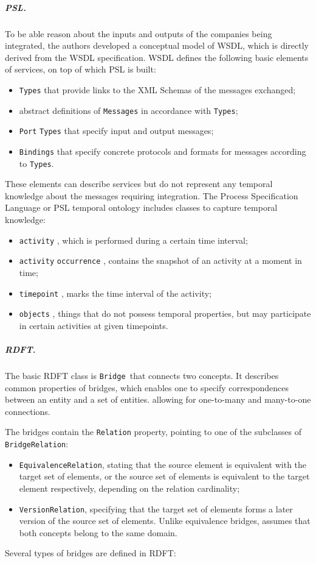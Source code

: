 \subparagraph{PSL.}
To be able reason about the inputs and outputs of the companies being
integrated, the authors developed a conceptual model of WSDL, which is
directly derived from the WSDL specification. WSDL defines the
following basic elements of services, on top of which PSL is built: 

\begin{itemize}
\item \texttt{Types} that provide links to the XML Schemas
of the messages exchanged; 
\item abstract definitions of \texttt{Messages} in
accordance with \texttt{Types}; 
\item \texttt{Port} \texttt{Types} that
specify input and output messages; 
\item \texttt{Bindings} that specify concrete protocols and
formats for messages according to \texttt{Types}. 
\end{itemize}
These elements can describe services but do not represent any temporal
knowledge about the messages requiring integration. The Process
Specification Language or PSL temporal ontology includes classes to
capture temporal knowledge: 

\begin{itemize}
\item \texttt{activity} , which is performed during a
certain time interval; 
\item \texttt{activity} \texttt{occurrence} ,
contains the snapshot of an activity at a moment in time; 
\item \texttt{timepoint} , marks the time interval of the
activity; 
\item \texttt{objects} , things that do not possess
temporal properties, but may participate in certain activities at given
timepoints. 
\end{itemize}
\subparagraph{RDFT.}
The basic RDFT class is \texttt{Bridge }that connects two
concepts. It describes common properties of bridges, which enables one
to specify correspondences between an entity and a set of entities.
allowing for one-to-many and many-to-one connections. 

The bridges contain the \texttt{Relation} property,
pointing to one of the subclasses of
\texttt{BridgeRelation}: 

\begin{itemize}
\item \texttt{EquivalenceRelation}, stating that the source
element is equivalent with the target set of elements, or the source
set of elements is equivalent to the target element respectively,
depending on the relation cardinality; 
\item \texttt{VersionRelation}, specifying that the target
set of elements forms a later version of the source set of elements.
Unlike equivalence bridges, assumes that both concepts belong to the
same domain. 
\end{itemize}
Several types of bridges are defined in RDFT: 

